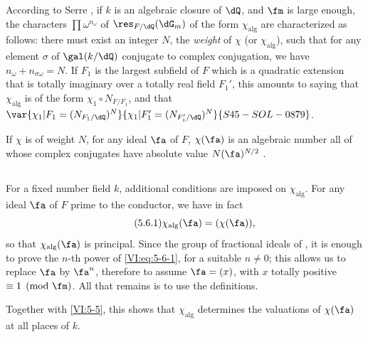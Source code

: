 According to Serre \cite[II.3]{se68}, if $k$ is an algebraic closure of 
$\dQ$, and $\fm$ is large enough, the characters $\prod \omega^{n_\omega}$ 
of $\res_{F/\dQ}(\dG_m)$ of the form $\chi_\text{alg}$ are characterized 
as follows: there must exist an integer $N$, the \emph{weight} of $\chi$ (or 
$\chi_\text{alg}$), such that for any element $\sigma$ of $\gal(k/\dQ)$ 
conjugate to complex conjugation, we have $n_\omega+n_{\sigma \omega}=N$. If 
$F_1$ is the largest subfield of $F$ which is a quadratic extension 
that is totally imaginary over a totally real field $F_1'$, this amounts to 
  saying that $\chi_\text{alg}$ is of the form $\chi_1\circ N_{F/F_1}$, and that 
  $\var{\chi_1|F_1=(N_{F_1/\dQ})^N}{\chi_1|F_1'=(N_{F_1'/\dQ})^N}{S45-SOL-0879}$. 

If $\chi$ is of weight $N$, for any ideal $\fa$ of $F$, $\chi(\fa)$ is an algebraic number all of whose complex conjugates have absolute value 
$N(\fa)^{N/2}$ \cite[II.3 prop.2]{se68}. 





\subsection{}\label{VI:5-6}

For a fixed number field $k$, additional conditions are 
imposed on $\chi_\text{alg}$. For any ideal $\fa$ of $F$ prime to the 
conductor, we have in fact 
\begin{equation*}\tag{5.6.1}\label{VI:eq:5-6-1}
  \chi_\text{alg}(\fa) = (\chi(\fa)) \text{,} 
\end{equation*}
so that $\chi_\text{alg}(\fa)$ is principal. Since the group of fractional ideals of , it is enough to prove the $n$-th power 
of \eqref{VI:eq:5-6-1}, for a suitable $n\ne 0$; this allows us 
to replace $\fa$ by $\fa^n$, therefore to assume $\fa=(x)$, with $x$ totally 
positive $\equiv 1\pmod\fm$. All that remains is to use the definitions. 

Together with \ref{VI:5-5}, this shows that $\chi_\text{alg}$ determines the 
valuations of $\chi(\fa)$ at all places of $k$. 





\subsection{}\label{VI:5-7}

